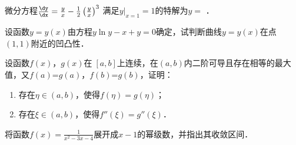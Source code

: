 \documentclass[plain,noanswer,medmath]{../../template/jnuexam}
\begin{document}
\begin{problem}
微分方程$\frac{\dy}{\dx} = \frac{y}{x} - \frac{1}{2}\left(\frac{y}{x} \right)^3$
满足$y\big|_{x = 1} = 1$的特解为$y =$ \fillin{}．
\end{problem}








\begin{problem}[points=10]
设函数$y = y(x)$由方程$y\ln y - x + y = 0$确定，试判断曲线$y = y(x)$在点$(1,1)$附近的凹凸性．
\end{problem}




\begin{problem}[points=11]
设函数$f(x)$，$g(x)$在$\;\left[a,b \right]$上连续，在$(a,b)$内二阶可导且存在相等的最大值，又$f(a)$=$g(a)$，$f(b)$=$g(b)$，证明：\par
\begin{enumerate}
  \item 存在$\eta \in(a,b)$，使得$f(\eta) = g(\eta)$；
  \item 存在$\xi \in(a,b)$，使得$f''(\xi) = g''(\xi)$．
\end{enumerate}
\end{problem}


\begin{problem}[points=10]
将函数$f(x) = \frac{1}{x^2 - 3x - 4}$展开成$x - 1$的幂级数，并指出其收敛区间．
\end{problem}








\end{document}
